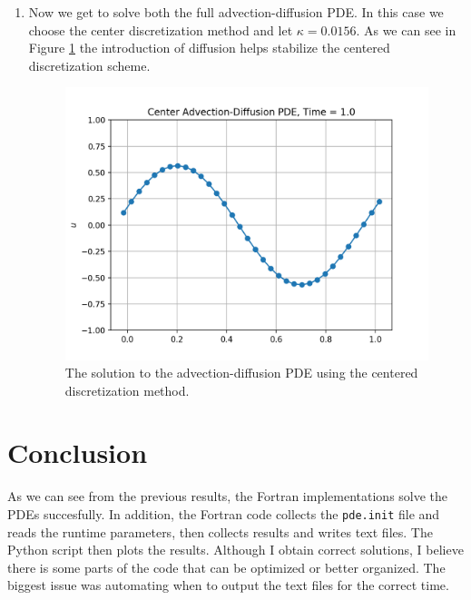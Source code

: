 \documentclass[12pt]{article}
\begin{document}
\begin{enumerate}[label=(\alph*)]
	\vspace{0.25in}
	\item Now we get to solve both the full advection-diffusion PDE. In this case we choose the center discretization method and let $\kappa = 0.0156$. As we can see in Figure \ref{fig:addiff} the introduction of diffusion helps stabilize the centered discretization scheme. 
	\begin{figure}[htb]
		\centering
		\includegraphics[width=0.7\linewidth]{./PDE/figures/plotsforh/result_advection_diffusion_32_center_h.png}
		\caption{The solution to the advection-diffusion PDE using the centered discretization method.}
		\label{fig:addiff}
	\end{figure}
	
	\end{enumerate}



\section{Conclusion}

As we can see from the previous results, the Fortran implementations solve the PDEs succesfully. In addition, the Fortran code collects the \texttt{pde.init} file and reads the runtime parameters, then collects results and writes text files. The Python script then plots the results. Although I obtain correct solutions, I believe there is some parts of the code that can be optimized or better organized. The biggest issue was automating when to output the text files for the correct time.
	
\end{document}
